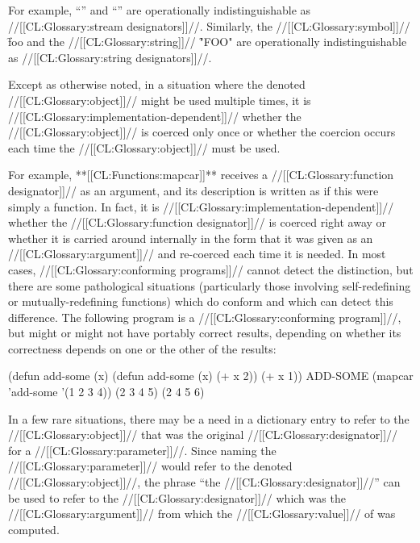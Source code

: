 For example, ``\nil'' and ``'' are operationally
indistinguishable as //[[CL:Glossary:stream designators]]//.  Similarly, 
the //[[CL:Glossary:symbol]]// \f{foo} and the //[[CL:Glossary:string]]// \f{"FOO"} 
are operationally indistinguishable as //[[CL:Glossary:string designators]]//.  

Except as otherwise noted, in a situation where the denoted //[[CL:Glossary:object]]// 
might be used multiple times, it is //[[CL:Glossary:implementation-dependent]]//
whether the //[[CL:Glossary:object]]// is coerced only once or whether the coercion occurs
each time the //[[CL:Glossary:object]]// must be used.

For example, **[[CL:Functions:mapcar]]** receives a //[[CL:Glossary:function designator]]// as an argument,
and its description is written as if this were simply a function.  In fact, it
is //[[CL:Glossary:implementation-dependent]]// whether the //[[CL:Glossary:function designator]]// is 
coerced right away or whether it is carried around internally in the form that
it was given as an //[[CL:Glossary:argument]]// and re-coerced each time it is needed.  In most
cases, //[[CL:Glossary:conforming programs]]// cannot detect the distinction, but there are some 
pathological situations (particularly those involving self-redefining or 
mutually-redefining functions) which do conform and which can detect this difference.
The following program is a //[[CL:Glossary:conforming program]]//, but might or might not have
portably correct results, depending on whether its correctness depends on one or
the other of the results:

\code
 (defun add-some (x) 
   (defun add-some (x) (+ x 2))
   (+ x 1)) \EV ADD-SOME
 (mapcar 'add-some '(1 2 3 4))
\EV (2 3 4 5)
\OV (2 4 5 6)
\endcode

In a few rare situations, there may be a need in a dictionary entry
to refer to the //[[CL:Glossary:object]]// that was the original //[[CL:Glossary:designator]]//
for a //[[CL:Glossary:parameter]]//.
Since naming the //[[CL:Glossary:parameter]]// would refer to the denoted //[[CL:Glossary:object]]//,
the phrase ``the  //[[CL:Glossary:designator]]//'' 
can be used to refer to the //[[CL:Glossary:designator]]// which was the //[[CL:Glossary:argument]]//
from which the //[[CL:Glossary:value]]// of  was computed.

\endsubsubsection%


